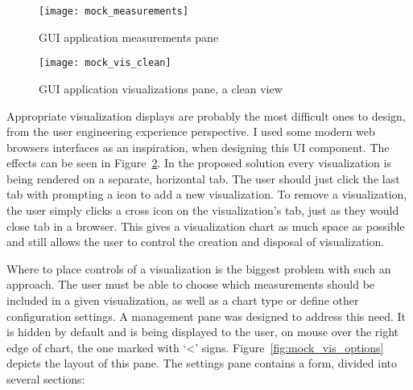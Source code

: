 \begin{figure}[ht]
\centering
\texttt{[image: mock\_measurements]}
\caption{GUI application measurements pane}
\label{fig:mock_measurements}
\end{figure}

\begin{figure}[ht]
\centering
\texttt{[image: mock\_vis\_clean]}
\caption{GUI application visualizations pane, a clean view}
\label{fig:mock_vis_clean}
\end{figure}

Appropriate visualization displays are probably the most difficult ones to design, from the user engineering experience perspective. I used some modern web browsers interfaces as an inspiration, when designing this UI component. The effects can be seen in Figure~\ref{fig:mock_vis_clean}. In the proposed solution every visualization is being rendered on a separate, horizontal tab. The user should just click the last tab with prompting a icon to add a new visualization. To remove a visualization, the user simply clicks a cross icon on the visualization\rq{}s tab, just as they would close tab in a browser. This gives a visualization chart as much space as possible and still allows the user to control the creation and disposal of visualization.

Where to place controls of a visualization is the biggest problem with such an approach. The user must be able to choose which measurements should be included in a given visualization, as well as a chart type or define other configuration settings. A management pane was designed to address this need. It is hidden by default and is being displayed to the user, on mouse over the right edge of chart, the one marked with \lq{}<\rq{} signs. Figure~\ref{fig:mock_vis_options} depicts the layout of this pane. The settings pane contains a form, divided into several sections:

